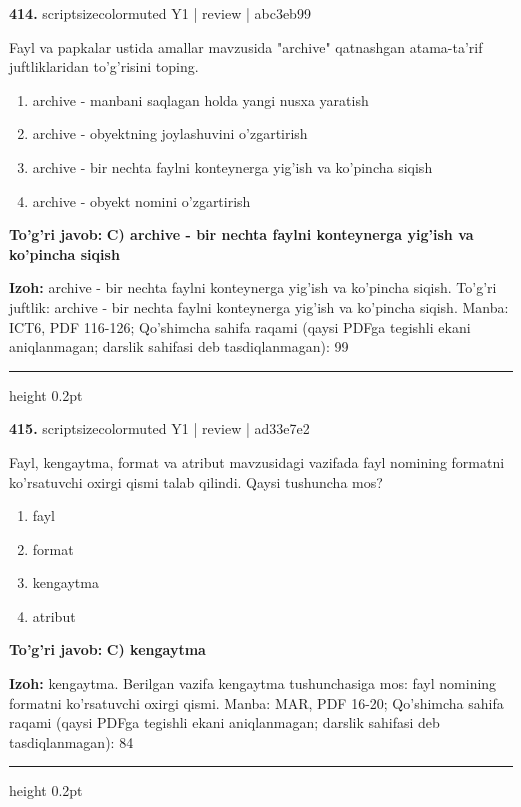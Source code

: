 \documentclass[10pt,a4paper]{article}
\begin{document}
{\bfseries\sffamily\color{ink} 414.} {scriptsizecolor{muted} Y1 | review | abc3eb99}
\par
Fayl va papkalar ustida amallar mavzusida "archive" qatnashgan atama-ta'rif juftliklaridan to'g'risini toping.
\begin{enumerate}[label=\Alph*),leftmargin=9mm]
\item archive - manbani saqlagan holda yangi nusxa yaratish
\item archive - obyektning joylashuvini o'zgartirish
\item archive - bir nechta faylni konteynerga yig'ish va ko'pincha siqish
\item archive - obyekt nomini o'zgartirish
\end{enumerate}
\begin{tcolorbox}[enhanced,breakable,colback=teal!4,colframe=teal!60!black,boxrule=0.45pt,arc=1.2mm,left=2.7mm,right=2.7mm,top=1.8mm,bottom=1.8mm,before skip=2mm,after skip=2mm]
{\bfseries\sffamily\color{teal}To'g'ri javob:} \textbf{C) archive - bir nechta faylni konteynerga yig'ish va ko'pincha siqish}
\par\smallskip
{\bfseries Izoh:} archive - bir nechta faylni konteynerga yig'ish va ko'pincha siqish. To'g'ri juftlik: archive - bir nechta faylni konteynerga yig'ish va ko'pincha siqish. Manba: ICT6, PDF 116-126; Qo'shimcha sahifa raqami (qaysi PDFga tegishli ekani aniqlanmagan; darslik sahifasi deb tasdiqlanmagan): 99
\end{tcolorbox}
\vspace{2mm}\hrule height 0.2pt\vspace{3mm}

{\bfseries\sffamily\color{ink} 415.} {scriptsizecolor{muted} Y1 | review | ad33e7e2}
\par
Fayl, kengaytma, format va atribut mavzusidagi vazifada fayl nomining formatni ko'rsatuvchi oxirgi qismi talab qilindi. Qaysi tushuncha mos?
\begin{enumerate}[label=\Alph*),leftmargin=9mm]
\item fayl
\item format
\item kengaytma
\item atribut
\end{enumerate}
\begin{tcolorbox}[enhanced,breakable,colback=teal!4,colframe=teal!60!black,boxrule=0.45pt,arc=1.2mm,left=2.7mm,right=2.7mm,top=1.8mm,bottom=1.8mm,before skip=2mm,after skip=2mm]
{\bfseries\sffamily\color{teal}To'g'ri javob:} \textbf{C) kengaytma}
\par\smallskip
{\bfseries Izoh:} kengaytma. Berilgan vazifa kengaytma tushunchasiga mos: fayl nomining formatni ko'rsatuvchi oxirgi qismi. Manba: MAR, PDF 16-20; Qo'shimcha sahifa raqami (qaysi PDFga tegishli ekani aniqlanmagan; darslik sahifasi deb tasdiqlanmagan): 84
\end{tcolorbox}
\vspace{2mm}\hrule height 0.2pt\vspace{3mm}
\end{document}
